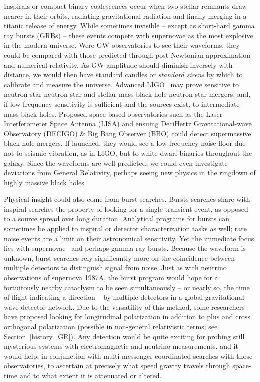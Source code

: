 Inspirals or compact binary coalescences occur when two stellar remnants draw nearer in their orbits, radiating gravitational radiation and finally merging in a titanic release of energy. 
While sometimes invisible -- except as short-hard gamma ray bursts (GRBs) -- these events compete with supernovae as the most explosive in the modern universe. 
Were GW observatories to see their waveforms, they could be compared with those predicted through post-Newtonian approximation and numerical relativity. 
As GW amplitude should diminish inversely with distance, we would then have standard candles or \textit{standard sirens} by which to calibrate and measure the universe. 
Advanced LIGO~\cite{aLIGOrefDesign,aLIGOsysDesign} may prove sensitive to neutron star-neutron star and stellar mass black hole-neutron star mergers, and, if low-frequency sensitivity is sufficient and the sources exist, to intermediate-mass black holes. 
Proposed space-based observatories such as the Laser Interferometer Space Antenna (LISA) and ensuing DeciHertz Gravitational-wave Observatory (DECIGO) \& Big Bang Observer (BBO) could detect supermassive black hole mergers. If launched, they would see a low-frequency noise floor due not to seismic vibration, as in LIGO, but to white dwarf binaries throughout the galaxy. 
Since the waveforms are well-predicted, we could even investigate deviations from General Relativity, perhaps seeing new physics in the ringdown of highly massive black holes.

Physical insight could also come from burst searches. 
Bursts searches share with inspiral searches the property of looking for a single transient event, as opposed to a source spread over long duration. 
Analytical programs for bursts can sometimes be applied to inspiral or detector characterization tasks as well; rare noise events are a limit on their astronomical sensitivity.
Yet the immediate focus lies with supernovae~\cite{Chandrasekhar1969,Ott2009} and perhaps gamma-ray bursts. 
Because the waveform is unknown, burst searches rely significantly more on the coincidence between multiple detectors to distinguish signal from noise. 
Just as with neutrino observations of supernova 1987A, the burst program would hope for a fortuitously nearby cataclysm to be seen simultaneously -- or nearly so, the time of flight indicating a direction -- by multiple detectors in a global gravitational-wave detector network. 
Due to the versatility of this method, some researchers have proposed looking for longitudinal polarization in addition to plus and cross orthogonal polarization (possible in non-general relativistic terms; see Section~\ref{history_GR}). 
Any detection would be quite exciting for probing still mysterious systems with electromagnetic and neutrino measurements, and it would help, in conjunction with multi-messenger coordinated searches with those observatories, to ascertain at precisely what speed gravity travels through space-time and to what extent it is attenuated or altered.

